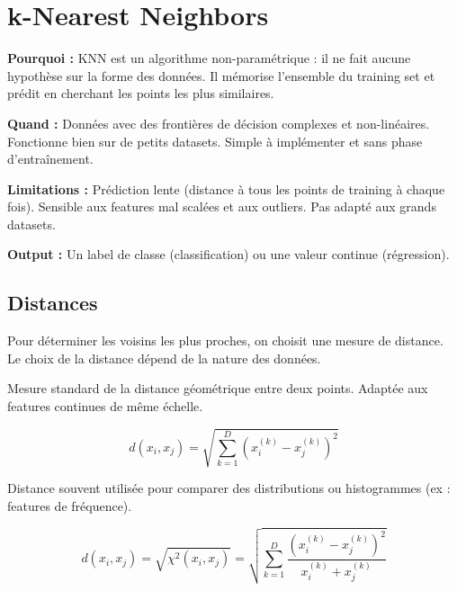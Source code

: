 \documentclass[11pt,a4paper,openany]{book}
\begin{document}
\section{k-Nearest Neighbors}

\begin{rembox}[title=Pourquoi et quand utiliser KNN ?]
\textbf{Pourquoi :} KNN est un algorithme non-paramétrique : il ne fait aucune hypothèse sur la forme des données. Il mémorise l'ensemble du training set et prédit en cherchant les points les plus similaires.

\vspace{0.3cm}

\textbf{Quand :} Données avec des frontières de décision complexes et non-linéaires. Fonctionne bien sur de petits datasets. Simple à implémenter et sans phase d'entraînement.

\vspace{0.3cm}

\textbf{Limitations :} Prédiction lente (distance à tous les points de training à chaque fois). Sensible aux features mal scalées et aux outliers. Pas adapté aux grands datasets.

\vspace{0.3cm}

\textbf{Output :} Un label de classe (classification) ou une valeur continue (régression).
\end{rembox}

\vspace{0.8cm}

\subsection{Distances}

Pour déterminer les voisins les plus proches, on choisit une mesure de distance.
Le choix de la distance dépend de la nature des données.

\vspace{0.5cm}

\begin{defnbox}[title=Euclidian distance]
Mesure standard de la distance géométrique entre deux points. Adaptée aux features continues de même échelle.

\[
d(x_i, x_j)
=
\sqrt{
\sum_{k=1}^{D}
(x_i^{(k)} - x_j^{(k)})^2
}
\]
\end{defnbox}

\vspace{0.5cm}

\begin{defnbox}[title=Chi-square distance]
Distance souvent utilisée pour comparer des distributions ou histogrammes (ex : features de fréquence).

\[
d(x_i, x_j)
=
\sqrt{\chi^2(x_i, x_j)}
=
\sqrt{
\sum_{k=1}^{D}
\frac{
\left(x_i^{(k)} - x_j^{(k)}\right)^2
}{
x_i^{(k)} + x_j^{(k)}
}
}
\]
\end{defnbox}
\end{document}
